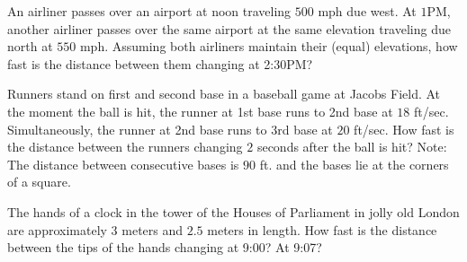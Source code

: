 \documentclass{ximera}
\begin{document}
 
\begin{exercise} 
An airliner passes over an airport at noon traveling $500$ mph due west.  At $1$PM, another airliner passes over the same airport at the same elevation traveling due north at $550$ mph.  Assuming both airliners maintain their (equal) elevations, how fast is the distance between them changing at 2:30PM?
\end{exercise}
\begin{exercise} 
Runners stand on first and second base in a baseball game at Jacobs Field.  At the moment the ball is hit, the runner at 1st base runs to 2nd base at $18$ ft/sec.  Simultaneously, the runner at 2nd base runs to 3rd base at $20$ ft/sec. How fast is the distance between the runners changing $2$ seconds after the ball is hit?  Note:  The distance between consecutive bases is $90$ ft. and the bases lie at the corners of a square.
\end{exercise}
\begin{exercise} 
The hands of a clock in the tower of the Houses of Parliament in jolly old London are approximately $3$ meters and $2.5$ meters in length.  How fast is the distance between the tips of the hands changing at 9:00?  At 9:07?
\end{exercise}
\end{document}
